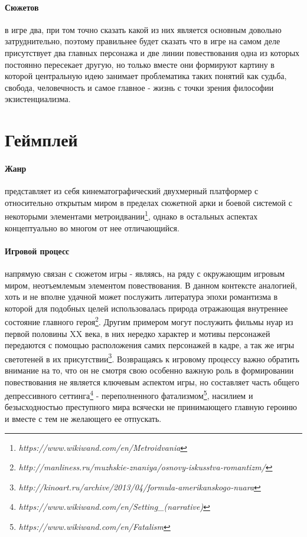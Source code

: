 \documentclass[11pt]{report}
\begin{document}
\paragraph{Сюжетов} в игре два, при том точно сказать какой из них является основным довольно затруднительно, поэтому правильнее будет сказать что в игре на самом деле присутствует два главных персонажа и две линии повествования одна из которых постоянно пересекает другую, но только вместе они формируют картину в которой центральную идею занимает проблематика таких понятий как судьба, свобода, человечность и самое главное - жизнь с точки зрения философии экзистенциализма.

\section{Геймплей}
\paragraph{Жанр} представляет из себя кинематографический двухмерный платформер с относительно открытым миром в пределах сюжетной арки и боевой системой с некоторыми элементами метроидвании\footnote{\emph{https://www.wikiwand.com/en/Metroidvania}}, однако в остальных аспектах концептуально во многом от нее отличающийся.
\paragraph{Игровой процесс} напрямую связан с сюжетом игры - являясь, на ряду с окружающим игровым миром, неотъемлемым элементом повествования. В данном контексте аналогией, хоть и не вполне удачной может послужить литература эпохи романтизма в которой для подобных целей использовалась природа отражающая внутреннее состояние главного героя\footnote{\emph{http://manliness.ru/muzhskie-znaniya/osnovy-iskusstva-romantizm/}}. Другим примером могут послужить фильмы нуар из первой половины XX века, в них нередко характер и мотивы персонажей передаются с помощью расположения самих персонажей в кадре, а так же игры светотеней в их присутствии\footnote{\emph{http://kinoart.ru/archive/2013/04/formula-amerikanskogo-nuara}}. Возвращаясь к игровому процессу важно обратить внимание на то, что он не смотря свою особенно важную роль в формировании повествования не является ключевым аспектом игры, но составляет часть общего депрессивного сеттинга\footnote{\emph{https://www.wikiwand.com/en/Setting\_(narrative)}} - переполненного фатализмом\footnote{\emph{https://www.wikiwand.com/en/Fatalism}}, насилием и безысходностью преступного мира всячески не принимающего главную героиню и вместе с тем не желающего ее отпускать.
\end{document}
